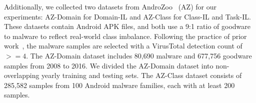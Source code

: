 

Additionally, we collected two datasets from AndroZoo~\cite{AndroZoo} (AZ) for our experiments: AZ-Domain for Domain-IL and AZ-Class for Class-IL and Task-IL. These datasets contain Android APK files, and both use a 9:1 ratio of goodware to malware to reflect real-world class imbalance. Following the practice of prior work~\cite{droidevolver}, the malware samples are selected with a VirusTotal detection count of $>= 4$. The AZ-Domain dataset includes 80,690 malware and 677,756 goodware samples from 2008 to 2016. We divided the AZ-Domain dataset into non-overlapping yearly training and testing sets. The AZ-Class dataset consists of 285,582 samples from 100 Android malware families, each with at least 200 samples.

